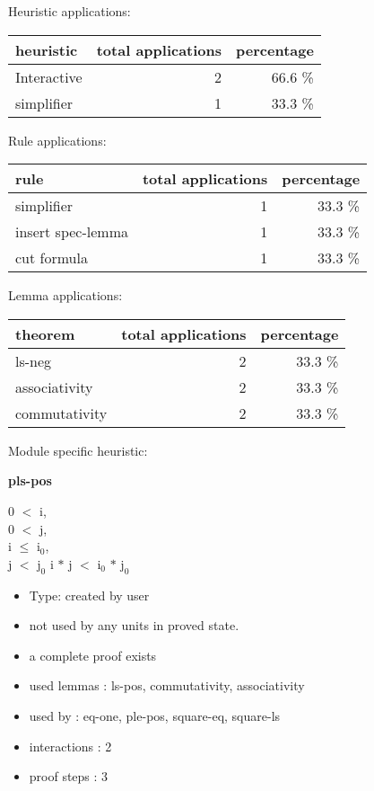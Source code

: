 \documentclass[a4paper]{article}
\begin{document}
\medskip


Heuristic applications:

\begin{supertabular}{l|r|r}
heuristic	& total applications & percentage \\ \hline
Interactive & 2 & 66.6 \% \\
simplifier & 1 & 33.3 \% \\

\end{supertabular}

Rule applications:

\begin{supertabular}{l|r|r}
rule	        & total applications & percentage \\ \hline
simplifier & 1 & 33.3 \% \\
insert spec-lemma & 1 & 33.3 \% \\
cut formula & 1 & 33.3 \% \\

\end{supertabular}

Lemma applications:

\begin{supertabular}{l|r|r}
theorem	        & total applications & percentage \\ \hline
ls-neg & 2 & 33.3 \% \\
associativity & 2 & 33.3 \% \\
commutativity & 2 & 33.3 \% \\

\end{supertabular}

Module specific heuristic:

\pagebreak

{\LARGE\bf pls-pos}\label{lemma-pls-pos}

\medskip

0 $<$ i, \\
0 $<$ j, \\
i $\le$ $\mbox{i}_{0}$, \\
j $<$ $\mbox{j}_{0}$ \Fol i $*$ j $<$ $\mbox{i}_{0}$ $*$ $\mbox{j}_{0}$

\begin{itemize}

\item Type: created by user

\item not used by any units in proved state.
\item       a complete proof exists
\item       used lemmas  : ls-pos, commutativity, associativity
\item       used by      : eq-one, ple-pos, square-eq, square-ls
\item       interactions : 2
\item       proof steps  : 3
\end{itemize}
\end{document}
